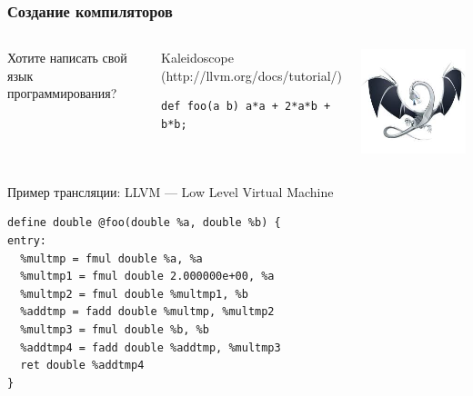 \documentclass{beamer}
\begin{document}
    \begin{frame}[fragile]
    \frametitle{Создание компиляторов}
    \begin{columns}
    Хотите написать свой язык программирования?
    \begin{block}{Kaleidoscope (http://llvm.org/docs/tutorial/)}
        \begin{verbatim}
def foo(a b) a*a + 2*a*b + b*b;   
        \end{verbatim}
    \end{block}
    \includegraphics[width=\linewidth]{fig/llvm-logo.jpeg}
    \end{columns}
    \begin{block}{Пример трансляции: LLVM --- Low Level Virtual Machine}
\begin{verbatim}
define double @foo(double %a, double %b) {
entry:
  %multmp = fmul double %a, %a
  %multmp1 = fmul double 2.000000e+00, %a
  %multmp2 = fmul double %multmp1, %b
  %addtmp = fadd double %multmp, %multmp2
  %multmp3 = fmul double %b, %b
  %addtmp4 = fadd double %addtmp, %multmp3
  ret double %addtmp4
}
\end{verbatim}
    \end{block}
\end{frame}
\end{document}
